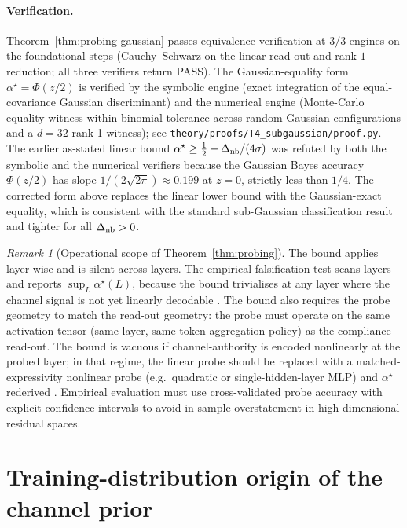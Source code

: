 \documentclass[11pt]{article}
\theoremstyle{definition}
\theoremstyle{remark}
\newtheorem{remark}{Remark}
\begin{document}
\paragraph{Verification.} Theorem~\ref{thm:probing-gaussian} passes equivalence verification at $3/3$ engines on the foundational steps (Cauchy--Schwarz
on the linear read-out and rank-$1$ reduction; all three verifiers return PASS). The Gaussian-equality form $\alpha^\star = \Phi(z/2)$ is verified by the symbolic engine (exact integration of the equal-covariance Gaussian discriminant) and the numerical engine (Monte-Carlo equality witness within binomial tolerance across random Gaussian configurations and a $d = 32$ rank-1 witness); see
\texttt{theory/proofs/T4\_subgaussian/proof.py}. The earlier as-stated linear bound
$\alpha^\star \ge \tfrac{1}{2} + \Delta_{\textnormal{nb}}/(4\sigma)$ was refuted by
both the symbolic and the numerical verifiers because the Gaussian Bayes accuracy $\Phi(z/2)$ has slope
$1/(2\sqrt{2\pi}) \approx 0.199$ at $z=0$, strictly less than $1/4$. The corrected
form above replaces the linear lower bound with the Gaussian-exact equality, which
is consistent with the standard sub-Gaussian classification result and tighter for
all $\Delta_{\textnormal{nb}} > 0$.

\begin{remark}[Operational scope of Theorem~\ref{thm:probing}]
\label{rem:probing-scope}
The bound applies layer-wise and is silent across layers. The empirical-falsification
test scans layers and reports $\sup_L \alpha^\star(L)$, because the bound trivialises
at any layer where the channel signal is not yet linearly decodable
\cite{voita2020mdl}. The bound also requires the probe geometry to match the
read-out geometry: the probe must operate on the same activation tensor (same layer,
same token-aggregation policy) as the compliance read-out. The bound is vacuous
if channel-authority is encoded nonlinearly at the probed layer; in that regime,
the linear probe should be replaced with a matched-expressivity nonlinear probe
(e.g.\ quadratic or single-hidden-layer MLP) and $\alpha^\star$ rederived
\cite{hewitt2019selectivity}. Empirical evaluation must use cross-validated probe
accuracy with explicit confidence intervals to avoid in-sample overstatement in
high-dimensional residual spaces.
\end{remark}

\section{Training-distribution origin of the channel prior}
\label{sec:training-distribution}
\end{document}
